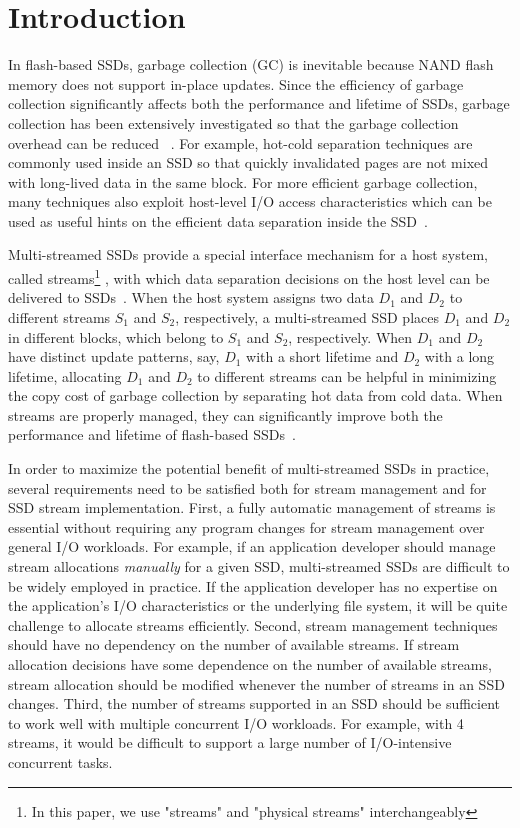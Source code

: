 \section{Introduction}
\label{sec:intro}
In flash-based SSDs, garbage collection (GC) is inevitable because NAND flash 
memory does not support in-place updates.  
Since the efficiency of garbage collection significantly affects  
both the performance and lifetime of SSDs, garbage collection has been extensively 
investigated so that the garbage collection overhead can be reduced
~\cite{GCGreedy, GCVictim, GCTTFlash, HotCold}.  
For example, hot-cold separation techniques are commonly used inside an SSD 
so that quickly invalidated pages are not mixed with long-lived data in the same block.   
For more efficient garbage collection, many techniques also exploit
host-level I/O access characteristics which can be used as useful hints on 
the efficient data separation inside the SSD~\cite{JiTGC, ShadowGC}.

Multi-streamed SSDs provide a special interface mechanism for 
a host system, called streams\footnote{In this paper, we use "streams" 
and "physical streams" interchangeably}
,  with which data separation decisions 
on the host level can be delivered to SSDs~\cite{T10, MultiStream}.  
When the host system assigns two data $D_1$ and $D_2$ to 
different streams $S_1$ and $S_2$, respectively, a multi-streamed SSD 
places $D_1$ and $D_2$ in different blocks, which belong to $S_1$ and $S_2$, respectively.
When $D_1$ and $D_2$ have distinct update patterns, say, $D_1$ with a short lifetime 
and $D_2$ with a long lifetime, allocating $D_1$ and $D_2$ to different streams 
can be helpful in minimizing the copy cost of
garbage collection by separating hot data from cold data.  
When streams are properly managed, they can significantly
improve both the performance and lifetime of 
flash-based SSDs~\cite{MultiStream, Level, FStream, vStream, AutoStream}.

In order to maximize the potential benefit of multi-streamed
SSDs in practice, several requirements need to be satisfied both for 
stream management and for SSD stream implementation.
First, a fully automatic management of streams is essential without requiring 
any program changes for stream management over general I/O workloads.
For example, if an
application developer should manage stream allocations {\it manually} for 
a given SSD, multi-streamed SSDs are difficult to be 
widely employed in practice.   If the application
developer has no expertise on the application's I/O characteristics or 
the underlying file system, it will be quite challenge to allocate streams efficiently.   
Second, stream management techniques should have no dependency on 
the number of available streams.  
If stream allocation decisions have some dependence on
the number of available streams,  
stream allocation should be modified
whenever the number of streams in an SSD changes.
Third, the number of streams supported in an SSD should be sufficient 
to work well with multiple concurrent I/O workloads.  
For example, with 4 streams, it would be difficult to support a large
number of I/O-intensive concurrent tasks.  

